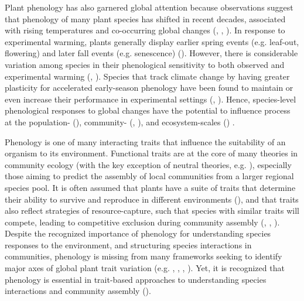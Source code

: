 \documentclass[11pt]{article}
\begin{document}
Plant phenology has also garnered global attention because observations suggest that phenology of many plant species has shifted in recent decades, associated with rising temperatures and co-occurring global changes (\citet{wolkovich2012warming}, \citet{parmesan2015plants}, \citet{menzel2020climate}). In response to experimental warming, plants generally display earlier spring events (e.g. leaf-out, flowering) and later fall events (e.g. senescence) (\citet{stuble2021plant}). However, there is considerable variation among species in their phenological sensitivity to both observed and experimental warming (\citet{cook2012divergent}, \citet{wolkovich2012warming}). Species that track climate change by having greater plasticity for accelerated early-season phenology have been found to maintain or even increase their performance in experimental settings (\citet{cleland2012phenological}, \citet{wolkovich2021phenological}). Hence, species-level phenological responses to global changes have the potential to influence process at the population- (\citet{iler2021demographic}), community- (\citet{cook2012divergent}, \citet{caradonna2014shifts}), and ecosystem-scales (\citet{piao2019plant}) .

Phenology is one of many interacting traits that influence the suitability of an organism to its environment. Functional traits are at the core of many theories in community ecology (with the key exception of neutral theories, e.g. \citet{hubbell2005neutral}), especially those aiming to predict the assembly of local communities from a larger regional species pool. It is often assumed that plants have a suite of traits that determine their ability to survive and reproduce in different environments (\citet{schimper1902plant}), and that traits also reflect strategies of resource-capture, such that species with similar traits will compete, leading to competitive exclusion during community assembly (\citet{gause1932experimental}, \citet{macarthur1967limiting}, \citet{abrams1983theory}). Despite the recognized importance of phenology for understanding species responses to the environment, and structuring species interactions in communities, phenology is missing from many frameworks seeking to identify major axes of global plant trait variation (e.g. \citet{westoby1998leaf}, \citet{wright2004worldwide}, \citet{diaz2016global}, \citet{joswig2022climatic}). Yet, it is recognized that phenology is essential in trait-based approaches to understanding species interactions and community assembly (\citet{cope2022role}).
\end{document}
